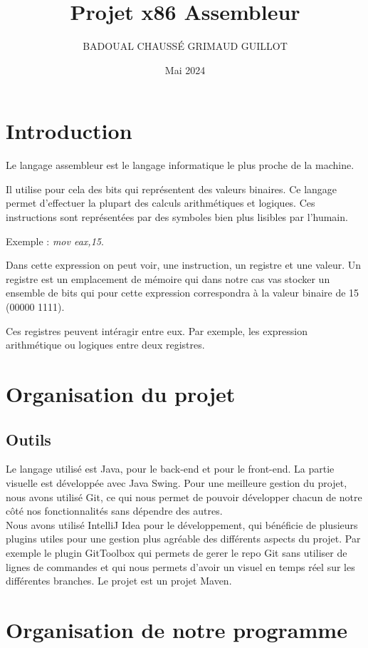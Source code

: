 \documentclass{article}
\title{Projet x86 Assembleur}
\author{BADOUAL CHAUSSÉ GRIMAUD GUILLOT}
\date{Mai 2024}
\begin{document}
\maketitle

\section{Introduction}
Le langage assembleur est le langage informatique le plus proche de la machine.

Il utilise pour cela des bits qui représentent des valeurs binaires.
Ce langage permet d'effectuer la plupart des calculs arithmétiques et logiques.
Ces instructions sont représentées par des symboles bien plus lisibles par l'humain.

Exemple : \emph{mov eax,15}.

Dans cette expression on peut voir, une instruction, un registre et une valeur.
Un registre est un emplacement de mémoire qui dans notre cas vas stocker un ensemble de bits qui pour cette expression correspondra
à la valeur binaire de 15 (00000 1111).

Ces registres peuvent intéragir entre eux. Par exemple, les expression arithmétique ou logiques entre deux registres.

\section{Organisation du projet}

\subsection{Outils}
Le langage utilisé est Java, pour le back-end et pour le front-end.
La partie visuelle est développée avec Java Swing.
Pour une meilleure gestion du projet, nous avons utilisé Git, ce qui nous permet de pouvoir développer chacun de notre côté nos fonctionnalités sans dépendre des autres.
\\
Nous avons utilisé IntelliJ Idea pour le développement, qui bénéficie de plusieurs plugins utiles pour une gestion plus agréable des différents aspects du projet.
Par exemple le plugin GitToolbox qui permets de gerer le repo Git sans utiliser de lignes de commandes et qui nous permets d'avoir un visuel en temps réel sur les différentes branches.
Le projet est un projet Maven.

\section{Organisation de notre programme}
\end{document}
